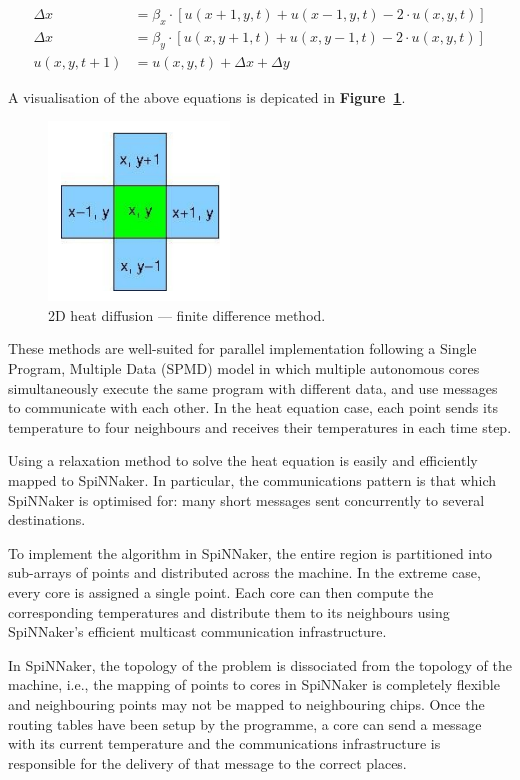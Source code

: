 \documentclass[a4paper, 11pt]{article}
\begin{document}
\begin{align*}
\Delta x   &= \beta_x \cdot [u(x+1,y,t) + u(x-1,y,t) - 2 \cdot u(x,y,t)] \\
\Delta x   &= \beta_y \cdot [u(x,y+1,t) + u(x,y-1,t) - 2 \cdot u(x,y,t)] \\
u(x,y,t+1) &= u(x,y,t) + \Delta x + \Delta y
\end{align*}

\noindent A visualisation of the above equations is depicated in \textbf{Figure~{\ref{fig:heatdemo_iterative}}}.
\begin{figure}[htbp]
	\centering
	\includegraphics[width=0.2\linewidth]{images/heatdemo_iterative.png}
	\caption{2D heat diffusion --- finite difference method.}	
	\label{fig:heatdemo_iterative}
\end{figure}

These methods are well-suited for parallel implementation following a Single Program, Multiple Data (SPMD) model in which multiple autonomous cores simultaneously execute the same program with different data, and use messages to communicate with each other. In the heat equation case, each point sends its temperature to four neighbours and receives their temperatures in each time step.

Using a relaxation method to solve the heat equation is easily and efficiently mapped to SpiNNaker. In particular, the communications pattern is that which SpiNNaker is optimised for: many short messages sent concurrently to several destinations.

To implement the algorithm in SpiNNaker, the entire region is partitioned into sub-arrays of points and distributed across the machine. In the extreme case, every core is assigned a single point. Each core can then compute the corresponding temperatures and distribute them to its neighbours using SpiNNaker's efficient multicast communication infrastructure.

In SpiNNaker, the topology of the problem is dissociated from the topology of the machine, i.e., the mapping of points to cores in SpiNNaker is completely flexible and neighbouring points may not be mapped to neighbouring chips. Once the routing tables have been setup by the programme, a core can send a message with its current temperature and the communications infrastructure is responsible for the delivery of that message to the correct places.
\end{document}
